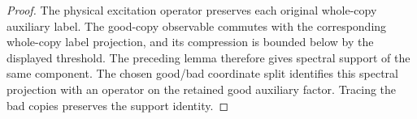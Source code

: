 \begin{proof}\leanok
{}
The physical excitation operator preserves each original whole-copy
auxiliary label. The good-copy observable commutes with the corresponding
whole-copy label projection, and its compression is bounded below by the
displayed threshold. The preceding lemma therefore gives spectral support
of the same component. The chosen good/bad coordinate split identifies this
spectral projection with an operator on the retained good auxiliary factor.
Tracing the bad copies preserves the support identity.
\end{proof}

